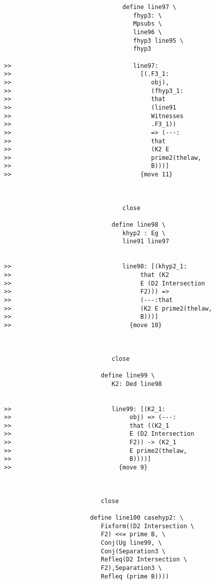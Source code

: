 \documentclass[12pt]{article}
\begin{document}
\begin{verbatim}
                                 define line97 \
                                    fhyp3: \
                                    Mpsubs \
                                    line96 \
                                    fhyp3 line95 \
                                    fhyp3

>>                                  line97:
>>                                    [(.F3_1:
>>                                       obj),
>>                                       (fhyp3_1:
>>                                       that
>>                                       (line91
>>                                       Witnesses
>>                                       .F3_1))
>>                                       => (---:
>>                                       that
>>                                       (K2 E
>>                                       prime2(thelaw,
>>                                       B)))]
>>                                    {move 11}



                                 close

                              define line98 \
                                 khyp2 : Eg \
                                 line91 line97


>>                               line98: [(khyp2_1:
>>                                    that (K2
>>                                    E (D2 Intersection
>>                                    F2))) =>
>>                                    (---:that
>>                                    (K2 E prime2(thelaw,
>>                                    B)))]
>>                                 {move 10}



                              close

                           define line99 \
                              K2: Ded line98


>>                            line99: [(K2_1:
>>                                 obj) => (---:
>>                                 that ((K2_1
>>                                 E (D2 Intersection
>>                                 F2)) -> (K2_1
>>                                 E prime2(thelaw,
>>                                 B))))]
>>                              {move 9}



                           close

                        define line100 casehyp2: \
                           Fixform((D2 Intersection \
                           F2) <<= prime B, \
                           Conj(Ug line99, \
                           Conj(Separation3 \
                           Refleq(D2 Intersection \
                           F2),Separation3 \
                           Refleq (prime B))))



\end{verbatim}
\end{document}
